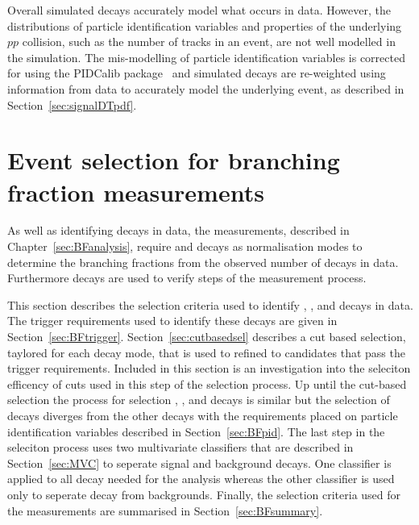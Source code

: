 Overall simulated decays accurately model what occurs in data. However, the distributions of particle identification variables and properties of the underlying $pp$ collision, such as the number of tracks in an event, are not well modelled in the simulation. %
The mis-modelling of particle identification variables is corrected for using the PIDCalib package~\cite{Anderlini:2202412} and simulated decays are re-weighted using information from data to accurately model the underlying event, as described in Section~\ref{sec:signalDTpdf}. 


\section{Event selection for branching fraction measurements}
\label{sec:BFsel}
As well as identifying \bmumu decays in data, the \BF measurements, described in Chapter~\ref{sec:BFanalysis}, require \bujpsik and \bhh decays as normalisation modes to determine the branching fractions from the observed number of \bmumu decays in data. 
Furthermore \bsjpsiphi decays are used to verify steps of the measurement process. 

This section describes the selection criteria used to identify \bmumu, \bhh, \bujpsik and \bsjpsiphi decays in data. The trigger requirements used to identify these decays are given in Section~\ref{sec:BFtrigger}. Section~\ref{sec:cutbasedsel} describes a cut based selection, taylored for each decay mode, that is used to refined to candidates that pass the trigger requirements. Included in this section is an investigation into the seleciton efficency of cuts used in this step of the selection process. Up until the cut-based selection the process for selection \bmumu, \bhh, \bujpsik and \bsjpsiphi decays is similar but the selection of \bmumu decays diverges from the other decays with the requirements placed on particle identification variables described in Section~\ref{sec:BFpid}. The last step in the seleciton process uses two multivariate classifiers that are described in Section~\ref{sec:MVC} to seperate signal and background decays. One classifier is applied to all decay needed for the \BF analysis whereas the other classifier is used only to seperate \bmumu decay from backgrounds.
Finally, the selection criteria used for the \BF measurements are summarised in Section~\ref{sec:BFsummary}.



